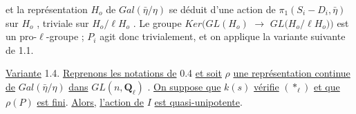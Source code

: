 et la représentation  $H_o$  de  $Gal(\bar{\eta}/\eta)$  se déduit d'une action de  $\pi_1(S_i-D_i,\bar{\eta})$  sur $H_o$ , triviale sur  $H_o/\ell H_o$ . Le groupe  $Ker(GL(H_o)$ $\longrightarrow$ $GL(H_o/$$\ell$$H_o))$  est un pro-$\ell$-groupe ; $P_i$  agit donc trivialement, et on applique la variante suivante de 1.1.

\underline{Variante} 1.4.  \underline{Reprenons les notations de} 0.4 \underline{et soit}  $\rho$  \underline{une représentation continue de} $Gal(\bar{\eta}/\eta)$  \underline{dans}  $GL(n,\mathbf{Q}_\ell)$ . \underline{On suppose que}  $k(s)$  \underline{vérifie}  $(\ast_\ell)$  \underline{et que}  $\rho(P)$ \underline{est fini}. \underline{Alors,} \underline{l'action de}  $I$  \underline{est quasi-unipotente}.


